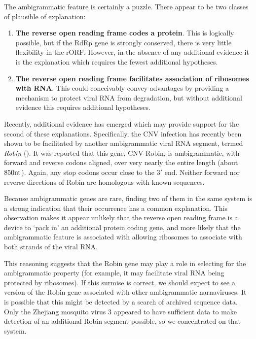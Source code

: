 \documentclass[unnumsec,webpdf,contemporary,large,namedate]{oup-authoring-template}%
\theoremstyle{thmstyleone}%
\theoremstyle{thmstyletwo}%
\theoremstyle{thmstylethree}%
\begin{document}
The ambigrammatic feature is certainly a puzzle. There appear to be two classes 
of plausible of explanation:

\begin{enumerate}

\item {\bf The reverse open reading frame codes a protein}. This is logically possible, but 
if the RdRp gene is strongly conserved, there is very little flexibility in the rORF. However, in the 
absence of any additional evidence it is the explanation which requires the fewest additional hypotheses.

\item {\bf The reverse open reading frame facilitates association of ribosomes with RNA}. This 
could conceivably convey advantages by providing a mechanism to protect viral RNA from 
degradation, but without additional evidence this requires additional hypotheses.

\end{enumerate}

Recently, additional evidence has emerged which may provide support for the second of these explanations.
Specifically, the CNV infection has recently been shown to be facilitated by another ambigrammatic viral 
RNA segment, termed \emph{Robin} (\cite{Bat+20,Ret+20}). It was reported that this gene, CNV-Robin, 
is ambigrammatic, with forward and reverse codons aligned, over very nearly 
the entire length (about $850{\rm nt}$). Again, any stop codons occur close to the $3'$ end.
Neither forward nor reverse directions of Robin are homologous with known sequences.

Because ambigrammatic genes are rare, finding two of them in the same system is a strong 
indication that their occurrence has a common explanation. This observation makes it 
appear unlikely that the reverse open reading frame is a device to \lq pack in' an additional 
protein coding gene, and more likely that the ambigrammatic feature is associated with 
allowing ribosomes to associate with both strands of the viral RNA. 

This reasoning suggests that the Robin gene may play a role in selecting for the 
ambigrammatic property (for example, it may facilitate viral RNA being protected 
by ribosomes). If this surmise is correct, we should expect to see a version of the Robin 
gene associated with other ambigrammatic narnaviruses. It is possible that this might be detected 
by a search of archived sequence data. Only the Zhejiang mosquito virus 3 appeared to 
have sufficient data to make detection of an additional Robin segment possible, so we 
concentrated on that system. 
\end{document}
